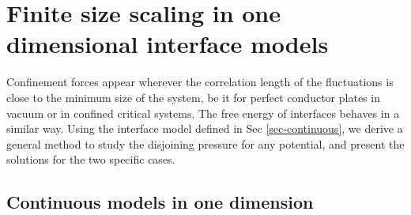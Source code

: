     \section{Finite size scaling in one dimensional interface models}
{\color{red}
Confinement forces appear wherever the correlation length of the fluctuations is close to the minimum size of the system, be it for perfect conductor plates in vacuum or in confined critical systems. The free energy of interfaces behaves in a similar way. Using the interface model defined in Sec \eqref{sec-continuous}, we derive a general method to study the disjoining pressure for any potential, and present the solutions for the two specific cases.
}
\subsection{Continuous models in one dimension}

